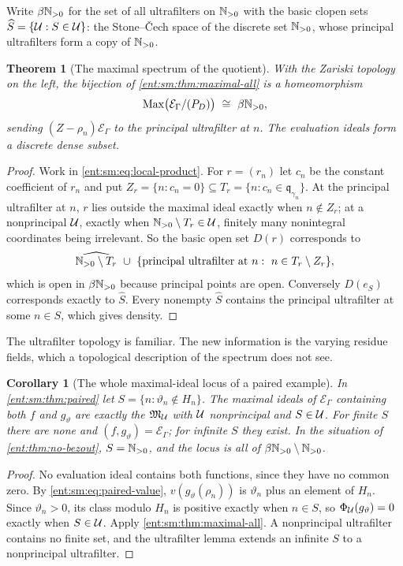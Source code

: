 \documentclass[11pt]{article}
\newtheorem{theorem}{Theorem}[section]
\theoremstyle{plain}
\theoremstyle{plain}
\theoremstyle{plain}
\newtheorem{corollary}[corollary]{Corollary}
\theoremstyle{definition}
\theoremstyle{definition}
\theoremstyle{definition}
\theoremstyle{definition}
\theoremstyle{remark}
\newcommand{\E}{\mathcal E_\Gamma}
\begin{document}
Write $\beta\mathbb N_{>0}$ for the set of all ultrafilters on $\mathbb N_{>0}$ with the
basic clopen sets $\widehat S=\{\mathcal U:S\in\mathcal U\}$: the Stone--\v{C}ech space
of the discrete set $\mathbb N_{>0}$, whose principal ultrafilters form a copy of
$\mathbb N_{>0}$.

\begin{theorem}[The maximal spectrum of the quotient]\label{ent:sm:thm:beta}
With the Zariski topology on the left, the bijection of
\cref{ent:sm:thm:maximal-all} is a homeomorphism
\[
 \operatorname{Max}\bigl(\E/(P_D)\bigr)\ \cong\ \beta\N_{>0},
\]
sending $(Z-\rho_n)\E$ to the principal ultrafilter at $n$. The evaluation
ideals form a discrete dense subset.
\end{theorem}
\begin{proof}
Work in \eqref{ent:sm:eq:local-product}. For $r=(r_n)$ let $c_n$ be the
constant coefficient of $r_n$ and put
$Z_r=\{n:c_n=0\}\subseteq T_r=\{n:c_n\in\mathfrak q_{\gamma_n}\}$. At the
principal ultrafilter at $n$, $r$ lies outside the maximal ideal exactly when
$n\notin Z_r$; at a nonprincipal $\mathcal U$, exactly when
$\mathbb N_{>0}\setminus T_r\in\mathcal U$, finitely many nonintegral coordinates being
irrelevant. So the basic open set $D(r)$ corresponds to
\[
 \widehat{\mathbb N_{>0}\setminus T_r}\ \cup\
 \{\text{principal ultrafilter at }n:\ n\in T_r\setminus Z_r\},
\]
which is open in $\beta\mathbb N_{>0}$ because principal points are open.
Conversely $D(e_S)$ corresponds exactly to $\widehat S$. Every nonempty
$\widehat S$ contains the principal ultrafilter at some $n\in S$, which gives
density.
\end{proof}

The ultrafilter topology is familiar. The new information is the varying
residue fields, which a topological description of the spectrum does not
see.

\begin{corollary}[The whole maximal-ideal locus of a paired example]
\label{ent:sm:cor:boundary-pair}
In \cref{ent:sm:thm:paired} let $S=\{n:\vartheta_n\notin H_n\}$. The maximal
ideals of $\E$ containing both $f$ and $g_\vartheta$ are exactly the
$\mathfrak M_\mathcal U$ with $\mathcal U$ nonprincipal and $S\in\mathcal U$. For finite $S$
there are none and $(f,g_\vartheta)=\E$; for infinite $S$ they exist. In the
situation of \cref{ent:thm:no-bezout}, $S=\mathbb N_{>0}$, and the locus is all of
$\beta\mathbb N_{>0}\setminus\mathbb N_{>0}$.
\end{corollary}
\begin{proof}
No evaluation ideal contains both functions, since they have no common zero.
By \eqref{ent:sm:eq:paired-value}, $v(g_\vartheta(\rho_n))$ is $\vartheta_n$
plus an element of $H_n$. Since $\vartheta_n>0$, its class modulo $H_n$ is
positive exactly when $n\in S$, so $\Phi_\mathcal U(g_\vartheta)=0$ exactly when
$S\in\mathcal U$. Apply \cref{ent:sm:thm:maximal-all}. A nonprincipal ultrafilter
contains no finite set, and the ultrafilter lemma extends an infinite $S$ to
a nonprincipal ultrafilter.
\end{proof}
\end{document}
